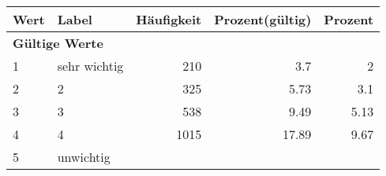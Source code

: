      \begin{longtable}{lXrrr}
     \toprule
     \textbf{Wert} & \textbf{Label} & \textbf{Häufigkeit} & \textbf{Prozent(gültig)} & \textbf{Prozent} \\
     \endhead
     \midrule
     \multicolumn{5}{l}{\textbf{Gültige Werte}}\\

     1 &
     \multicolumn{1}{X}{ sehr wichtig   } &


       \num{210} &
       \num[round-mode=places,round-precision=2]{3,7} &
         \num[round-mode=places,round-precision=2]{2} \\

     2 &
     \multicolumn{1}{X}{ 2   } &


       \num{325} &
       \num[round-mode=places,round-precision=2]{5,73} &
         \num[round-mode=places,round-precision=2]{3,1} \\

     3 &
     \multicolumn{1}{X}{ 3   } &


       \num{538} &
       \num[round-mode=places,round-precision=2]{9,49} &
         \num[round-mode=places,round-precision=2]{5,13} \\

     4 &
     \multicolumn{1}{X}{ 4   } &


       \num{1015} &
       \num[round-mode=places,round-precision=2]{17,89} &
         \num[round-mode=places,round-precision=2]{9,67} \\

     5 &
     \multicolumn{1}{X}{ unwichtig   } &



\end{longtable}
